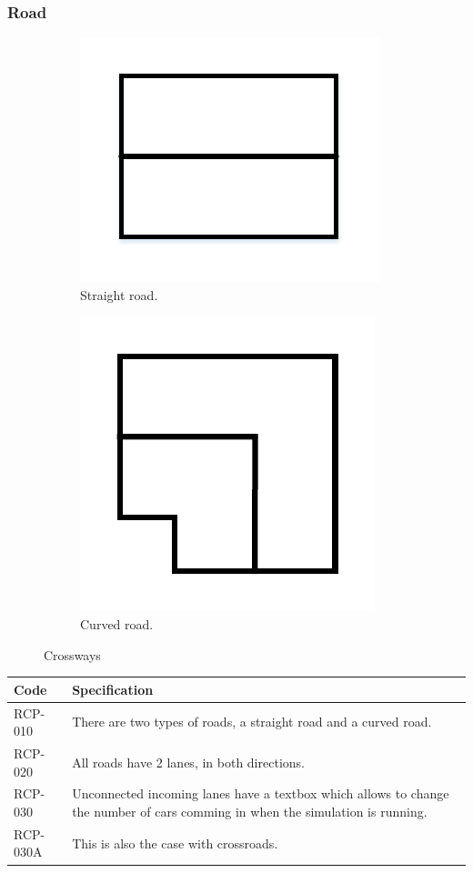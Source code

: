 \subsubsection{Road}
\begin{figure}
	\centering
	\begin{subfigure}{.5\textwidth}
		\centering
		\includegraphics{figures/straightroad.pdf}
		\caption{Straight road.}
		\label{fig:strr}
	\end{subfigure}%
	\begin{subfigure}{.5\textwidth}
		\centering
		\includegraphics{figures/curvedroad.pdf}
		\caption{Curved road.}
		\label{fig:curvedr}
	\end{subfigure}
	\caption{Crossways}
	\label{fig:road}
\end{figure}

\begin{tabularx}{\textwidth}{|p{2cm}X|}\hline
	Code & Specification \\\hline
	RCP-010 & There are two types of roads, a straight road and a curved road.\\\hline
	RCP-020 & All roads have 2 lanes, in both directions.\\\hline
	RCP-030 & Unconnected incoming lanes have a textbox which allows to change the number of cars comming in when the simulation is running.\\\hline
	RCP-030A & This is also the case with crossroads.\\\hline
\end{tabularx}

